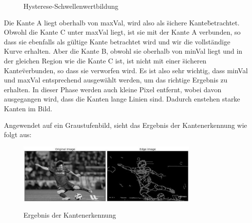 \begin{compactenum}
\begin{compactenum}
\begin{figure}[H]
            \caption{Hysterese-Schwellenwertbildung}
            \cite{hysteresisPic}
            \label{fig:anpr:edge:hysteresis}
            \end{figure}
            Die Kante A liegt oberhalb von maxVal, wird also als \"sichere Kante\" betrachtet. Obwohl die Kante C unter maxVal liegt, ist sie mit der Kante A verbunden, so dass sie ebenfalls als gültige Kante betrachtet wird und wir die vollständige Kurve erhalten. Aber die Kante B, obwohl sie oberhalb von minVal liegt und in der gleichen Region wie die Kante C ist, ist nicht mit einer \"sicheren Kante\" verbunden, so dass sie verworfen wird. Es ist also sehr wichtig, dass minVal und maxVal entsprechend ausgewählt werden, um das richtige Ergebnis zu erhalten.
            In dieser Phase werden auch kleine Pixel entfernt, wobei davon ausgegangen wird, dass die Kanten lange Linien sind. Dadurch enstehen starke Kanten im Bild.
    \end{compactenum}
\end{compactenum}
Angewendet auf ein Graustufenbild, sieht das Ergebnis der Kantenerkennung wie folgt aus:
\begin{figure}[H]
    \centering
    \includegraphics[width=0.8\textwidth]{pics/canny1.jpg}
    \caption{Ergebnis der Kantenerkennung}
    \cite{CannyPic}
    \label{fig:anpr:edge:canny}
    \end{figure}
